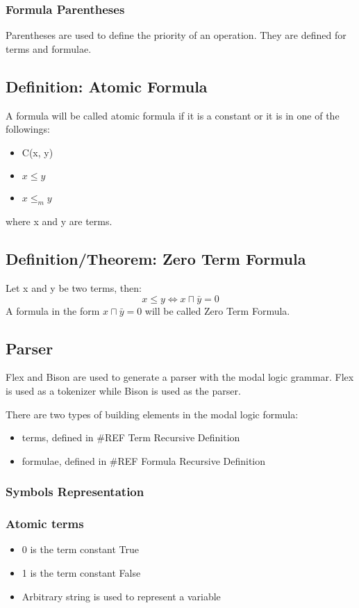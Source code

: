 \documentclass{article}
\begin{document}
	\subsubsection*{Formula Parentheses}
		Parentheses are used to define the priority of an operation. They are defined for terms and formulae.
	
	\subsection{Definition: Atomic Formula}
		A formula will be called atomic formula if it is a constant or it is in one of the followings:
		\begin{itemize}
			\item C(x, y)
			\item $x \le y$
			\item $x \le_m y$
		\end{itemize}
		where x and y are terms.
	
	\subsection{Definition/Theorem: Zero Term Formula}
		Let x and y be two terms, then:
		\begin{equation}
			x \le y  \iff x \sqcap \bar{y} = 0
		\end{equation}
		A formula in the form $x \sqcap \bar{y} = 0$ will be called Zero Term Formula.


	\subsection{Parser}
		Flex and Bison are used to generate a parser with the modal logic grammar.
		Flex is used as a tokenizer while Bison is used as the parser.

		There are two types of building elements in the modal logic formula:
		\begin{itemize}
			\item terms, defined in \#REF Term Recursive Definition
			\item formulae, defined in \#REF Formula Recursive Definition
		\end{itemize}
		
	\subsubsection{Symbols Representation}
		\subsubsection*{Atomic terms}
		\begin{itemize}
			\item 0 is the term constant True
			\item 1 is the term constant False
			\item Arbitrary string is used to represent a variable
		\end{itemize}
		
\end{document}
